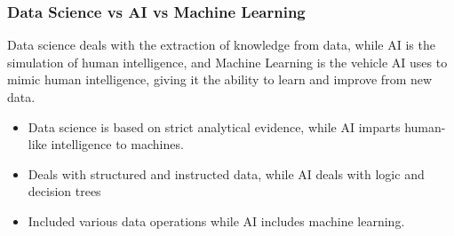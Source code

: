 \documentclass[12pt letter]{report}
\begin{document}


\subsubsection{Data Science vs AI vs Machine Learning}

Data science deals with the extraction of knowledge from data, while AI is the simulation of human intelligence, and
Machine Learning is the vehicle AI uses to mimic human intelligence, giving it the ability to learn and improve from new
data.
\begin{itemize}
  \item Data science is based on strict analytical evidence, while AI imparts human-like intelligence to machines.
  \item Deals with structured and instructed data, while AI deals with logic and decision trees
  \item Included various data operations while AI includes machine learning.
\end{itemize}
\end{document}
